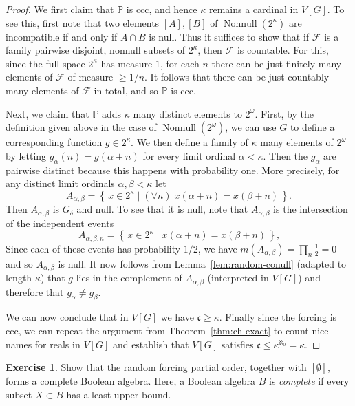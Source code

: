 \documentclass[11pt,oneside]{amsbook}
\newcommand{\set}[1]{\left\{\,#1\,\right\}}
\newcommand{\PP}{\mathbb P}
\DeclareMathOperator{\Nonnull}{Nonnull}
\theoremstyle{definition}
\newtheorem{exercise}{Exercise}[section]
\theoremstyle{plain}
\theoremstyle{definition}
\theoremstyle{remark}
\numberwithin{equation}{section}
\numberwithin{figure}{section}
\begin{document}
\begin{proof}
  We first claim that $\PP$ is ccc, and hence $\kappa$ remains a cardinal in $V[G]$. To see this, first note that two elements $[A],[B]$ of $\Nonnull(2^\kappa)$ are incompatible if and only if $A\cap B$ is null. Thus it suffices to show that if $\mathcal F$ is a family pairwise disjoint, nonnull subsets of $2^\kappa$, then $\mathcal F$ is countable. For this, since the full space $2^\kappa$ has measure $1$, for each $n$ there can be just finitely many elements of $\mathcal F$ of measure $\geq1/n$. It follows that there can be just countably many elements of $\mathcal F$ in total, and so $\PP$ is ccc.

  Next, we claim that $\PP$ adds $\kappa$ many distinct elements to $2^\omega$. First, by the definition given above in the case of $\Nonnull(2^\omega)$, we can use $G$ to define a corresponding function $g\in2^\kappa$. We then define a family of $\kappa$ many elements of $2^\omega$ by letting $g_\alpha(n)=g(\alpha+n)$ for every limit ordinal $\alpha<\kappa$. Then the $g_\alpha$ are pairwise distinct because this happens with probability one. More precisely, for any distinct limit ordinals $\alpha,\beta<\kappa$ let
  \[A_{\alpha,\beta}=\set{x\in2^\kappa\mid(\forall n)\;x(\alpha+n)=x(\beta+n)}\text{.}
  \]
  Then $A_{\alpha,\beta}$ is $G_\delta$ and null. To see that it is null, note that $A_{\alpha,\beta}$ is the intersection of the independent events
  \[A_{\alpha,\beta,n}=\set{x\in2^\kappa\mid x(\alpha+n)=x(\beta+n)}\text{,}
  \]
  Since each of these events has probability $1/2$, we have $m(A_{\alpha,\beta})=\prod_n\frac12=0$ and so $A_{\alpha,\beta}$ is null. It now follows from Lemma~\ref{lem:random-conull} (adapted to length $\kappa$) that $g$ lies in the complement of $A_{\alpha,\beta}$ (interpreted in $V[G]$) and therefore that $g_\alpha\neq g_\beta$.

  We can now conclude that in $V[G]$ we have $\mathfrak c\geq\kappa$. Finally since the forcing is ccc, we can repeat the argument from Theorem~\ref{thm:ch-exact} to count nice names for reals in $V[G]$ and establish that $V[G]$ satisfies $\mathfrak c\leq\kappa^{\aleph_0}=\kappa$.
\end{proof}


\begin{exercise}
  Show that the random forcing partial order, together with $[\emptyset]$, forms a complete Boolean algebra. Here, a Boolean algebra $B$ is \emph{complete} if every subset $X\subset B$ has a least upper bound.
\end{exercise}
\end{document}
